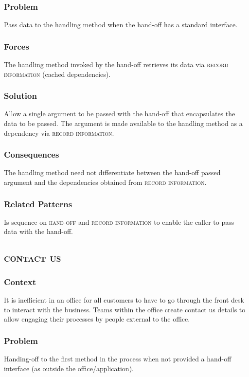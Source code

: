 \documentclass[prodmode]{style/acmlarge}
\begin{document}
\subsubsection*{Problem} Pass data to the handling method when the hand-off has
a standard interface.

\subsubsection*{Forces} The handling method invoked by the hand-off retrieves
its data via \textsc{record information} (cached dependencies).

\subsubsection*{Solution} Allow a single argument to be passed with the hand-off
that encapsulates the data to be passed.  The argument is made available to the
handling method as a dependency via \textsc{record information}.

\subsubsection*{Consequences} The handling method need not differentiate between
the hand-off passed argument and the dependencies obtained from \textsc{record
information}.

\subsubsection*{Related Patterns} Is sequence on \textsc{hand-off} and
\textsc{record information} to enable the caller to pass data with the hand-off.



\subsection{\textsc{\textbf{contact us}}}

\subsubsection*{Context} It is inefficient in an office for all customers to
have to go through the front desk to interact with the business.  Teams within
the office create contact us details to allow engaging their processes by people
external to the office.

\subsubsection*{Problem} Handing-off to the first method in the process when not
provided a hand-off interface (as outside the office/application).
\end{document}
